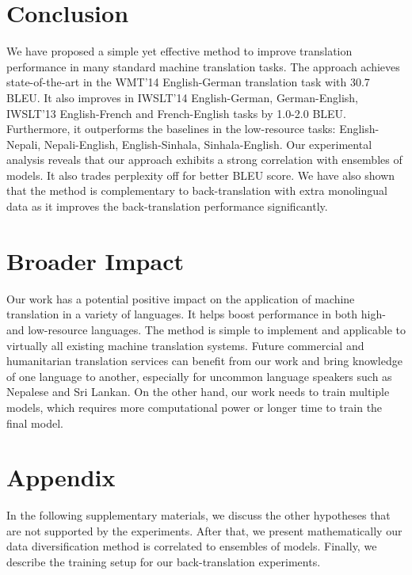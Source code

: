 \documentclass{article}
\begin{document}
 
\section{Conclusion} \label{sec:conclusion}

We have proposed a simple yet effective method to improve translation performance in many standard machine translation tasks. 
The approach achieves state-of-the-art in the WMT'14 English-German translation task with 30.7 BLEU. It also improves in IWSLT'14 English-German, German-English, IWSLT'13 English-French and French-English tasks by 1.0-2.0 BLEU. Furthermore, it outperforms the baselines in the low-resource tasks: English-Nepali, Nepali-English, English-Sinhala, Sinhala-English. Our experimental analysis reveals that our approach exhibits a strong correlation with ensembles of models. It also trades perplexity off for better BLEU score. We have also shown that the method is complementary to back-translation with extra monolingual data as it improves the back-translation performance significantly.

\section*{Broader Impact}

Our work has a potential positive impact on the application of machine translation in a variety of languages. It helps boost performance in both high- and low-resource languages. The method is simple to implement and applicable to virtually all existing machine translation systems. Future commercial and humanitarian translation services can benefit from our work and bring knowledge of one language to another, especially for uncommon language speakers such as Nepalese and Sri Lankan. On the other hand, our work needs to train multiple models, which requires more computational power or longer time to train the final model.





\newpage
\appendix
\section{Appendix}\label{sec:appendix}



{In the following supplementary materials, we discuss the other hypotheses that are not supported by the experiments. 
After that, we present mathematically our data diversification method is correlated to ensembles of models.
Finally, we describe the training setup for our back-translation experiments.} 
\end{document}
